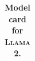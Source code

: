 \documentclass{article}
\newcommand{\cinnamon}{\textsc{Llama 2}\xspace}
\begin{document}
\begin{table}[htbp]
{\begin{tabular}{ p{2.8cm}|p{12.2cm}  }
\end{tabular}}
\caption{\textbf{Model card for \cinnamon.}}
\label{tab:model_card}
\end{table}
\end{document}
